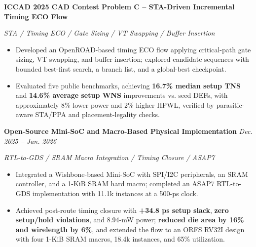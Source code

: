 \documentclass[a4paper,11pt]{article}
\newcommand{\resumeItem}[1]{
  \item
  \small{
    #1
  }
}
\newcommand{\resumeItemListStart}{
  \begin{itemize}[
    leftmargin=0.18in,
    itemsep=1.5pt,
    topsep=1.5pt,
    parsep=0pt,
    partopsep=0pt
  ]
}
\newcommand{\resumeItemListEnd}{
  \end{itemize}
  \vspace{-3pt}
}
\newcommand{\resumeProjectHeading}[3]{
  \vspace{-1pt}
  \item

  \begin{minipage}[t]{\linewidth}

    \textbf{#1}
    \hfill
    {\textit{\small\color{darkgrey} #3}}

    \vspace{1pt}

    {\textit{\small\color{darkgrey} #2}}

  \end{minipage}

  \vspace{-4pt}
}
\newcommand{\ProjectEntrySep}{
  \vspace{0pt}
}
\begin{document}

\resumeProjectHeading
  {ICCAD 2025 CAD Contest Problem C -- STA-Driven Incremental Timing ECO Flow}
  {
    STA / Timing ECO / Gate Sizing / VT Swapping / Buffer Insertion
  }
  {}

\resumeItemListStart

  \resumeItem{
    Developed an OpenROAD-based timing ECO flow applying critical-path gate
    sizing, VT swapping, and buffer insertion; explored candidate sequences
    with bounded best-first search, a branch list, and a global-best checkpoint.
  }

  \resumeItem{
    Evaluated five public benchmarks, achieving \textbf{16.7\% median setup TNS}
    and \textbf{14.6\% average setup WNS} improvements vs. seed DEFs,
    with approximately 8\% lower power and 2\% higher HPWL, verified by
    parasitic-aware STA/PPA and placement-legality checks.
  }

\resumeItemListEnd

\ProjectEntrySep



\resumeProjectHeading
  {Open-Source Mini-SoC and Macro-Based Physical Implementation}
  {
    RTL-to-GDS / SRAM Macro Integration / Timing Closure / ASAP7
  }
  {Dec. 2025 -- Jan. 2026}

\resumeItemListStart

  \resumeItem{
    Integrated a Wishbone-based Mini-SoC with SPI/I2C peripherals,
    an SRAM controller, and a 1-KiB SRAM hard macro; completed an ASAP7
    RTL-to-GDS implementation with 11.1k instances at a 500-ps clock.
  }

  \resumeItem{
    Achieved post-route timing closure with \textbf{+34.8 ps setup slack},
    \textbf{zero setup/hold violations}, and 8.94-mW power; \textbf{reduced die area by
    16\% and wirelength by 6\%}, and extended the flow to an ORFS RV32I
    design with four 1-KiB SRAM macros, 18.4k instances, and 65\% utilization.
  }

\resumeItemListEnd

\ProjectEntrySep


\end{document}
